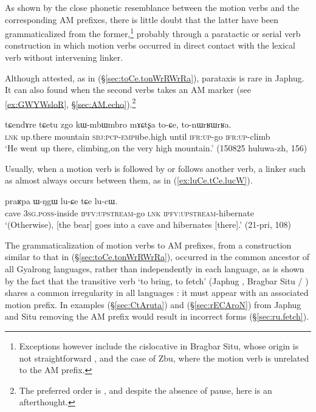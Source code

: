 As shown by the close phonetic resemblance between the motion verbs and the corresponding AM prefixes, there is little doubt that the latter have been grammaticalized from the former,\footnote{Exceptions however include the cislocative  in Bragbar Situ, whose origin is not straightforward \citep{zhangshuya20these}, and the case of Zbu, where the motion verb  is unrelated to the AM prefix. } probably through a paratactic or serial verb construction in which motion verbs occurred in direct contact with the lexical verb without intervening linker. 

Although attested, as in (§\ref{sec:toCe.tonWrRWrRa}), parataxis is rare in Japhug. It can also found when the second verbs takes an AM marker (see \ref{ex:GWYWsloR}, §\ref{sec:AM.echo}).\footnote{The preferred order is , and despite the absence of pause,  here is an afterthought. }

\begin{exe}
 \ex  \label{sec:toCe.tonWrRWrRa}
\gll tɕendɤre tɕetu zgo kɯ-mbɯ\redp{}mbro mɤɕtʂa to-ɕe, to-nɯrʁɯrʁa. \\
\textsc{lnk} up.there mountain \textsc{sbj}:\textsc{pcp}-\textsc{emph}\redp{}be.high until \textsc{ifr}:\textsc{up}-go \textsc{ifr}:\textsc{up}-climb \\
\glt `He went up there, climbing,on the very high mountain.' (150825 huluwa-zh, 156)
\end{exe}

Usually, when a motion verb is followed by or follows another verb, a linker such as  almost always occurs between them, as in (\ref{ex:luCe.tCe.lucW}).

\begin{exe}
	\ex  \label{ex:luCe.tCe.lucW}
	\gll praʁpa ɯ-ŋgɯ lu-ɕe tɕe lu-cɯ. \\
	cave \textsc{3sg}.\textsc{poss}-inside \textsc{ipfv}:\textsc{upstream}-go \textsc{lnk} \textsc{ipfv}:\textsc{upstream}-hibernate \\
	\glt `(Otherwise), [the bear] goes into a cave and hibernates [there].' (21-pri, 108)
\end{exe}

The grammaticalization of motion verbs to AM prefixes, from a construction similar to that in (§\ref{sec:toCe.tonWrRWrRa}), occurred in the common ancestor of all Gyalrong languages, rather than independently in each language, as is shown by the fact that the transitive verb `to bring, to fetch' (Japhug , Bragbar Situ  / ) shares a common irregularity in all languages \citep{jacques13harmonization}: it must appear with an associated motion prefix. In examples (§\ref{sec:CtAruta}) and (§\ref{sec:rECAroN}) from Japhug and Situ removing the AM prefix would result in incorrect forms (§\ref{sec:ru.fetch}).


